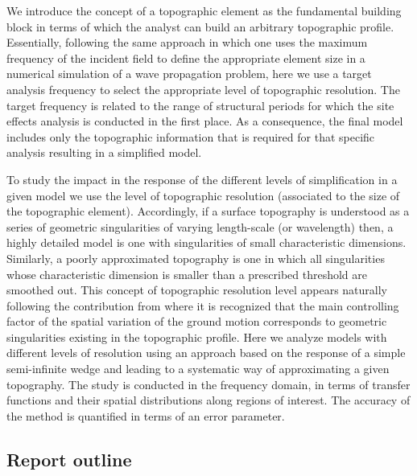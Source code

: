 \documentclass[11pt,letterpaper]{article}
\begin{document}
We introduce the concept of a topographic element as the fundamental building block in terms of which the analyst can build an arbitrary topographic profile. Essentially, following the same approach in which one uses the maximum frequency of the incident field to define the appropriate element size in a numerical simulation of a wave propagation problem, here we use a target analysis frequency to select the appropriate level of topographic resolution. The target frequency is related to the range of structural periods for which the site effects analysis is conducted in the first place. As a consequence, the final model includes only the topographic information that is required for that specific analysis resulting in a simplified model. 

To study the impact in the response of the different levels of simplification in a given model we use the level of topographic resolution (associated to the size of the topographic element). Accordingly, if a surface topography is understood as a series of geometric singularities of varying length-scale (or wavelength) then, a highly detailed model is one with singularities of small characteristic dimensions. Similarly, a poorly approximated topography is one in which all singularities whose characteristic dimension is smaller than a prescribed threshold are smoothed out. This concept of topographic resolution level appears naturally following the contribution from \cite{jaramillo2013analytic} where it is recognized that the main controlling factor of the spatial variation of the ground motion corresponds to geometric singularities existing in the topographic profile. Here we analyze models with different levels of resolution using an approach based on the response of a simple semi-infinite wedge and leading to a systematic way of approximating a given topography. The study is conducted in the frequency domain, in terms of transfer functions and their spatial distributions along regions of interest. The accuracy of the method is quantified in terms of an error parameter.

\subsection*{Report outline}
\end{document}
